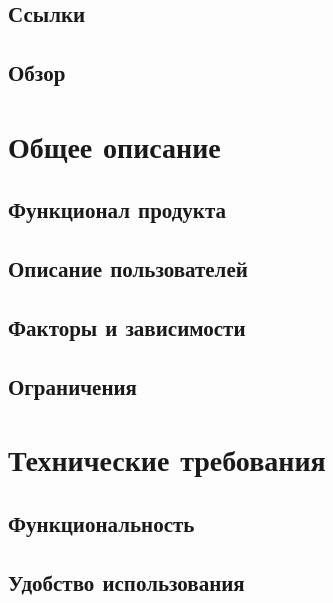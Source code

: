 \documentclass{article}
\begin{document}
\subsection{Ссылки}


\subsection{Обзор}


\section{Общее описание}

\subsection{Функционал продукта}


\subsection{Описание пользователей}


\subsection{Факторы и зависимости}


\subsection{Ограничения}


\section{Технические требования}

\subsection{Функциональность}


\subsection{Удобство использования}

\end{document}

